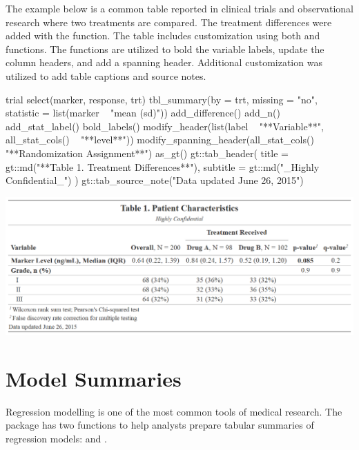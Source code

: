 The example below is a common table reported in clinical trials and observational research where two treatments are compared.
The treatment differences were added with the  function.
The table includes customization using both  and  functions.
The  functions are utilized to bold the variable labels,  update the column headers, and add a spanning header.
Additional  customization was utilized to add table captions and source notes.

\begin{example}
trial %
  select(marker, response, trt) %
  tbl_summary(by = trt, missing = "no",
              statistic = list(marker ~ "{mean} ({sd})")) %
  add_difference() %
  add_n() %
  add_stat_label() %
  bold_labels() %
  modify_header(list(label ~ "**Variable**", all_stat_cols() ~ "**{level}**")) %
  modify_spanning_header(all_stat_cols() ~ "**Randomization Assignment**") %
  as_gt() %
  gt::tab_header(
    title = gt::md("**Table 1. Treatment Differences**"),
    subtitle = gt::md("_Highly Confidential_")
  ) %
  gt::tab_source_note("Data updated June 26, 2015")
\end{example}
\begin{widefigure}[h!]
  \includegraphics[scale=0.49]{custom.png}
  \centering
\end{widefigure}

\section{Model Summaries}

Regression modelling is one of the most common tools of medical research.
The  package has two functions to help analysts prepare tabular summaries of regression models:  and .

\subsection{\texorpdfstring{}{tbl\_regression()}}

